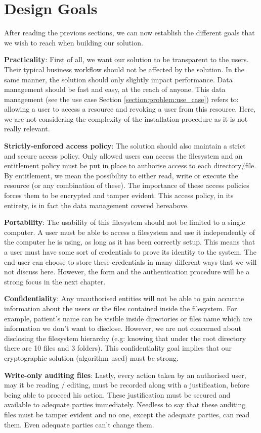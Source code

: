 \documentclass[../main.tex]{subfiles}
\begin{document}
\section{Design Goals}
\label{section:problem:design_goals}
\par After reading the previous sections, we can now establish the different goals that we wish to reach when building our solution.
\par \textbf{Practicality}: First of all, we want our solution to be transparent to the users. Their typical business workflow should not be affected by the solution. In the same manner, the solution should only slightly impact performance. Data management should be fast and easy, at the reach of anyone.  This data management (see the use case Section \ref{section:problem:use_case}) refers to: allowing a  user to access a resource and revoking a user from this resource. Here, we are not considering the complexity of the installation procedure as it is not really relevant.
\par \textbf{Strictly-enforced access policy}: The solution should also maintain a strict and secure access policy. Only allowed users can access the filesystem and an entitlement policy must be put in place to authorise access to each directory/file. By entitlement, we mean the possibility to either read, write or execute the resource (or any combination of these). The importance of these access policies forces them to be encrypted and tamper evident. This access policy, in its entirety, is in fact the data management covered hereabove.
\par \textbf{Portability}: The usability of this filesystem should not be limited to a single computer. A user must be able to access a filesystem and use it independently of the computer he is using, as long as it has been correctly setup. This means that a user must have some sort of credentials to prove its identity to the system. The end-user can choose to store these credentials in many different ways that we will not discuss here. However, the form and the authentication procedure will be a strong focus in the next chapter.
\par \textbf{Confidentiality}: Any unauthorised entities will not be able to gain accurate information about the users or the files contained inside the filesystem. For example, patient's name can be visible inside directories or files name which are information we don't want to disclose. However, we are not concerned about disclosing the filesystem hierarchy (e.g: knowing that under the root directory there are 10 files and 3 folders). This confidentiality goal implies that our cryptographic solution (algorithm used) must be strong. 
\par \textbf{Write-only auditing files}: Lastly, every action taken by an authorised user, may it be reading / editing, must be recorded along with a justification, before being able to proceed his action. These justification must be secured and available to adequate parties immediately. Needless to say that these auditing files must be tamper evident and no one, except the adequate parties, can read them. Even adequate parties can't change them.
\end{document}
